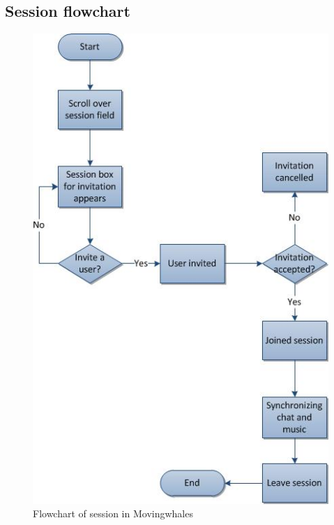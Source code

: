 \subsection{Session flowchart}

\begin{figure}[h!]
\centering
\includegraphics[scale=0.5]{design/figures/session_flowchart}
\caption{Flowchart of session in Movingwhales}
\end{figure}

